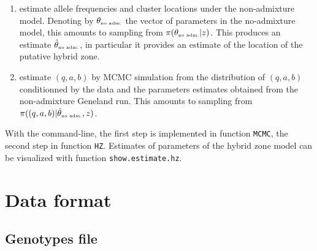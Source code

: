 \documentclass[a4paper,10pt]{article}
\begin{document}
\begin{enumerate}
\item estimate allele frequencies and cluster locations under the non-admixture model. Denoting by $\theta_{\mbox{\tiny no adm.}}$ the vector of 
parameters in the no-admixture model, this amounts to sampling from $\pi(\theta_{\mbox{\tiny no adm.}} |z)$. This produces 
an estimate $\hat{\theta}_{\mbox{\tiny no adm.}}$, in particular it provides an estimate of the location of the putative hybrid zone. 
\item estimate  $(q,a,b)$ by MCMC simulation from the distribution of  $(q,a,b)$ conditionned by the data and the parameters estimates obtained from the non-admixture Geneland run. This amounts to sampling from  $\pi( (q,a,b) | \hat{\theta}_{\mbox{\tiny no adm.}} , z)$.
\end{enumerate}

With the command-line, the first step is implemented in function {\tt MCMC}, the second step in function {\tt HZ}.
Estimates of parameters of the hybrid zone model can be visualized with function {\tt show.estimate.hz}.
\clearpage
\section{Data format}\label{sec:data_format}

\subsection{Genotypes file}
\end{document}
